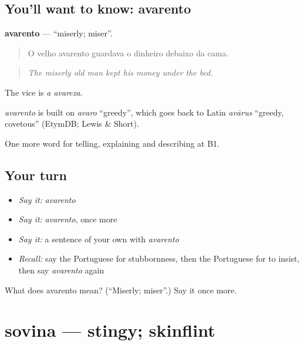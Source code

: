 \subsection*{You'll want to know: avarento}
\textbf{avarento} — \textquotedblleft{}miserly; miser\textquotedblright{}.

\begin{quote}
O velho avarento guardava o dinheiro debaixo da cama.
\end{quote}

\begin{quote}
\emph{The miserly old man kept his money under the bed.}
\end{quote}

The vice is \emph{a avareza}.

\begin{cousinweb}
\emph{avarento} is built on \emph{avaro} \textquotedblleft{}greedy\textquotedblright{}, which goes back to Latin \emph{avārus} \textquotedblleft{}greedy, covetous\textquotedblright{} (EtymDB; Lewis \& Short).
\end{cousinweb}

\begin{grammarlens}[title={What you've built}]
One more word for telling, explaining and describing at B1.
\end{grammarlens}

\subsection*{Your turn}
\begin{itemize}
\raggedright
  \item \emph{Say it:} \emph{avarento}
  \item \emph{Say it:} \emph{avarento}, once more
  \item \emph{Say it:} a sentence of your own with \emph{avarento}
  \item \emph{Recall:} say the Portuguese for stubbornness, then the Portuguese for to insist, then say \emph{avarento} again
\end{itemize}

\begin{tcolorbox}[breakable,colback=teal!4,colframe=teal!35!black,title={Before you move on}]
What does avarento mean? (\textquotedblleft{}Miserly; miser\textquotedblright{}.) Say it once more.
\end{tcolorbox}
\section[sovina]{sovina — stingy; skinflint}

